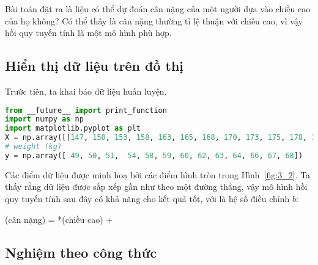 Bài toán đặt ra là liệu có thể dự đoán cân nặng của một người dựa vào chiều cao
của họ không? Có thể thấy là cân nặng thường tỉ lệ thuận với chiều cao, vì vậy hồi quy tuyến tính là một mô hình phù hợp.



\subsection{Hiển thị dữ liệu trên đồ thị}
Trước tiên, ta khai báo dữ liệu huấn luyện.
\begin{lstlisting}[language=Python]
from __future__ import print_function
import numpy as np
import matplotlib.pyplot as plt
X = np.array([[147, 150, 153, 158, 163, 165, 168, 170, 173, 175, 178, 180, 183]]).T  # height (cm), input data, each row is a data point
# weight (kg)
y = np.array([ 49, 50, 51,  54, 58, 59, 60, 62, 63, 64, 66, 67, 68])
\end{lstlisting}



Các điểm dữ liệu được minh hoạ bởi các điểm hình tròn trong Hình~\ref{fig:3_2}.
Ta thấy rằng dữ liệu được sắp xếp gần như theo một đường thẳng, vậy mô hình hồi
quy tuyến tính sau đây có khả năng cho kết quả tốt, với  là
hệ số điều chỉnh $b$:
\begin{center}
(cân nặng) = *(chiều cao) + 
\end{center}


\subsection{Nghiệm theo công thức}

